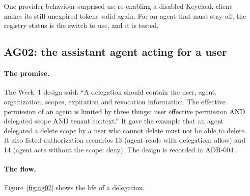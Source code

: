 One provider behaviour surprised us: re-enabling a disabled Keycloak client makes its still-unexpired tokens valid again. For an agent that must stay off, the registry status is the switch to use, and it is tested.

\subsection{AG02: the assistant agent acting for a user}
\label{sec:ag02-design}
\paragraph{The promise.} The Week~1 design said: ``A delegation should contain the user, agent, organization, scopes, expiration and revocation information. The effective permission of an agent is limited by three things: user effective permission AND delegated scope AND tenant context.'' It gave the example that an agent delegated a delete scope by a user who cannot delete must not be able to delete. It also listed authorization scenarios 13 (agent reads with delegation: allow) and 14 (agent acts without the scope: deny). The design is recorded in ADR-004 \cite{adr4}.

\paragraph{The flow.} Figure~\ref{fig:ag02} shows the life of a delegation.

